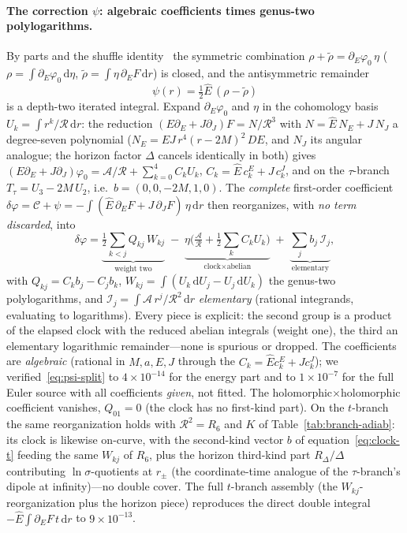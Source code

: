 \documentclass[12pt]{iopart}
\theoremstyle{plain}
\theoremstyle{definition}
\theoremstyle{remark}
\newcommand{\Ehat}{\hat E}
\newcommand{\dd}{\mathrm{d}}
\begin{document}
\paragraph{The correction $\psi$: algebraic coefficients times genus-two
polylogarithms.} By parts and the shuffle identity~\cite{Chen1977} the symmetric
combination $\rho+\tilde\rho=\partial_E\varphi_0\,\eta$
($\rho=\int\partial_E\varphi_0\,\dd\eta$,
$\tilde\rho=\int\eta\,\partial_E F\,\dd r$) is closed, and the antisymmetric
remainder
\begin{equation}
    \psi(r)=\tfrac12\Ehat\,(\rho-\tilde\rho)
    \label{eq:psi-irr}
\end{equation}
is a depth-two iterated integral. Expand $\partial_E\varphi_0$ and $\eta$ in the
cohomology basis $U_k=\int r^k/\mathcal{R}\,\dd r$: the reduction
$(E\partial_E+J\partial_J)F=N/\mathcal{R}^3$ with $N=\Ehat\,N_E+J\,N_J$ a degree-seven
polynomial ($N_E=EJ\,r^4(r-2M)^2\,DE$, and $N_J$ its angular analogue; the horizon
factor $\Delta$ cancels identically in both) gives
$(E\partial_E+J\partial_J)\varphi_0=\mathcal{A}/\mathcal{R}+\sum_{k=0}^{4} C_k U_k$,
$C_k=\Ehat\,c_k^{E}+J\,c_k^{J}$, and on the
$\tau$-branch $T_\tau=U_3-2M\,U_2$, i.e.\ $b=(0,0,-2M,1,0)$. The \emph{complete}
first-order coefficient $\delta\varphi=\mathcal{C}+\psi=-\!\int(\Ehat\,\partial_E F
+J\,\partial_J F)\,\eta\,\dd r$ then reorganizes, with \emph{no term discarded}, into
\begin{equation}
    \delta\varphi=
    \underbrace{\tfrac12\!\sum_{k<j}Q_{kj}\,W_{kj}}_{\text{weight two}}
    \;-\;\underbrace{\eta\Big(\tfrac{\mathcal{A}}{\mathcal{R}}
    +\tfrac12\!\sum_k C_k U_k\Big)}_{\text{clock}\times\text{abelian}}
    \;+\;\underbrace{\sum_j b_j\,\mathcal{I}_j}_{\text{elementary}},
    \label{eq:psi-split}
\end{equation}
with $Q_{kj}=C_k b_j-C_j b_k$, $W_{kj}=\int(U_k\,\dd U_j-U_j\,\dd U_k)$ the
genus-two polylogarithms, and $\mathcal{I}_j=\int\mathcal{A}\,r^j/\mathcal{R}^2\,
\dd r$ \emph{elementary} (rational integrands, evaluating to logarithms). Every
piece is explicit: the second group is a product of the elapsed clock with the
reduced abelian integrals (weight one), the third an elementary logarithmic
remainder---none is spurious or dropped. The coefficients are \emph{algebraic}
(rational in $M,a,E,J$ through the $C_k=\Ehat c_k^E+J c_k^J$); we
verified~\eqref{eq:psi-split} to $4\times10^{-14}$ for the energy part and to
$1\times10^{-7}$ for the full Euler source with all coefficients \emph{given}, not
fitted. The
holomorphic$\times$holomorphic coefficient vanishes, $Q_{01}=0$ (the clock has no
first-kind part). On the $t$-branch the same reorganization holds with
$\mathcal{R}^2=R_6$ and $K$ of Table~\ref{tab:branch-adiab}: its clock is likewise
on-curve, with the second-kind vector $b$ of equation~\eqref{eq:clock-t} feeding the same
$W_{kj}$ of $R_6$, plus the horizon third-kind part $R_\Delta/\Delta$ contributing
$\ln\sigma$-quotients at $r_\pm$ (the coordinate-time analogue of the $\tau$-branch's
dipole at infinity)---no double cover. The full $t$-branch assembly (the
$W_{kj}$-reorganization plus the horizon piece) reproduces the direct double integral
$-\Ehat\!\int\!\partial_E F\,t\,\dd r$ to $9\times10^{-13}$.
\end{document}
